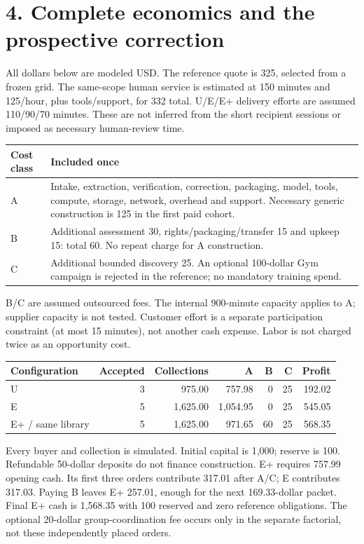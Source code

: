 \documentclass[10pt]{article}
\begin{document}
\clearpage
\section*{4. Complete economics and the prospective correction}

All dollars below are modeled USD. The reference quote is 325, selected from a frozen grid. The same-scope human service is estimated at 150 minutes and 125/hour, plus tools/support, for 332 total. U/E/E+ delivery efforts are assumed 110/90/70 minutes. These are not inferred from the short recipient sessions or imposed as necessary human-review time.

\begin{tabularx}{\textwidth}{p{}Y}
\toprule Cost class & Included once\\\midrule
A & Intake, extraction, verification, correction, packaging, model, tools, compute, storage, network, overhead and support. Necessary generic construction is 125 in the first paid cohort.\\
B & Additional assessment 30, rights/packaging/transfer 15 and upkeep 15: total 60. No repeat charge for A construction.\\
C & Additional bounded discovery 25. An optional 100-dollar Gym campaign is rejected in the reference; no mandatory training spend.\\\bottomrule
\end{tabularx}

B/C are assumed outsourced fees. The internal 900-minute capacity applies to A; supplier capacity is not tested. Customer effort is a separate participation constraint (at most 15 minutes), not another cash expense. Labor is not charged twice as an opportunity cost.

\begin{tabularx}{\textwidth}{lrrrrrr}
\toprule Configuration & Accepted & Collections & A & B & C & Profit\\\midrule
U &3 &975.00 &757.98 &0 &25 &192.02\\
E &5 &1,625.00 &1,054.95 &0 &25 &545.05\\
E+ / same library &5 &1,625.00 &971.65 &60 &25 &568.35\\\bottomrule
\end{tabularx}

Every buyer and collection is simulated. Initial capital is 1,000; reserve is 100. Refundable 50-dollar deposits do not finance construction. E+ requires 757.99 opening cash. Its first three orders contribute 317.01 after A/C; E contributes 317.03. Paying B leaves E+ 257.01, enough for the next 169.33-dollar packet. Final E+ cash is 1,568.35 with 100 reserved and zero reference obligations. The optional 20-dollar group-coordination fee occurs only in the separate factorial, not these independently placed orders.
\end{document}
